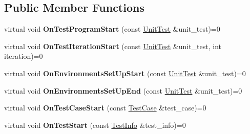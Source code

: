 \subsection*{Public Member Functions}
\begin{DoxyCompactItemize}
\item 
\mbox{\label{classtesting_1_1_test_event_listener_a5f6c84f39851e8a603a2d2e10063816b}} 
virtual void {\bfseries On\+Test\+Program\+Start} (const \mbox{\hyperlink{classtesting_1_1_unit_test}{Unit\+Test}} \&unit\+\_\+test)=0
\item 
\mbox{\label{classtesting_1_1_test_event_listener_a60cc09b7907cb329d152eb5e7133bdeb}} 
virtual void {\bfseries On\+Test\+Iteration\+Start} (const \mbox{\hyperlink{classtesting_1_1_unit_test}{Unit\+Test}} \&unit\+\_\+test, int iteration)=0
\item 
\mbox{\label{classtesting_1_1_test_event_listener_aa6502e534919605be45f26a6daf9a40c}} 
virtual void {\bfseries On\+Environments\+Set\+Up\+Start} (const \mbox{\hyperlink{classtesting_1_1_unit_test}{Unit\+Test}} \&unit\+\_\+test)=0
\item 
\mbox{\label{classtesting_1_1_test_event_listener_aaa1021d75f5dbf3f05c829c1cc520341}} 
virtual void {\bfseries On\+Environments\+Set\+Up\+End} (const \mbox{\hyperlink{classtesting_1_1_unit_test}{Unit\+Test}} \&unit\+\_\+test)=0
\item 
\mbox{\label{classtesting_1_1_test_event_listener_ab4ed885d63f5bbff8076c1329b3dfe36}} 
virtual void {\bfseries On\+Test\+Case\+Start} (const \mbox{\hyperlink{classtesting_1_1_test_case}{Test\+Case}} \&test\+\_\+case)=0
\item 
\mbox{\label{classtesting_1_1_test_event_listener_ab4f6a0ca16ae75daf385b3b5914e1048}} 
virtual void {\bfseries On\+Test\+Start} (const \mbox{\hyperlink{classtesting_1_1_test_info}{Test\+Info}} \&test\+\_\+info)=0
\item 
\mbox{\label{classtesting_1_1_test_event_listener_a054f8705c883fa120b91473aff38f2ee}} 

\end{DoxyCompactItemize}

